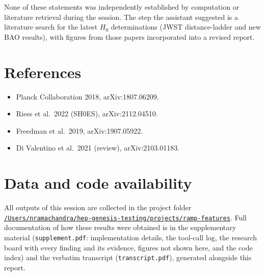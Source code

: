 \documentclass[11pt,a4paper]{article}
\begin{document}
None of these statements was independently established by computation or literature retrieval during the session. The step the assistant suggested is a literature search for the latest $H_0$ determinations (JWST distance-ladder and new BAO results), with figures from those papers incorporated into a revised report.

\section*{References}
\begin{itemize}
\item Planck Collaboration 2018, arXiv:1807.06209.
\item Riess et al.\ 2022 (SH0ES), arXiv:2112.04510.
\item Freedman et al.\ 2019, arXiv:1907.05922.
\item Di Valentino et al.\ 2021 (review), arXiv:2103.01183.
\end{itemize}

\section*{Data and code availability}
All outputs of this session are collected in the project folder \href{file:///Users/nramachandra/hep-genesis-testing/projects/ramp-features}{\texttt{/\allowbreak{}Users/\allowbreak{}nramachandra/\allowbreak{}hep-genesis-testing/\allowbreak{}projects/\allowbreak{}ramp-features}}.
Full documentation of how these results were obtained is in the supplementary material (\texttt{supplement.pdf}: implementation details, the tool-call log, the research board with every finding and its evidence, figures not shown here, and the code index) and the verbatim transcript (\texttt{transcript.pdf}), generated alongside this report.
\end{document}
